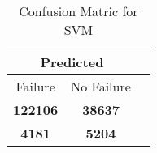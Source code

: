 \begin{table}[] 
\caption{Confusion Matric for SVM} 
\label{Table: Prediction Accuracy-NoneSVMRandomForest100EKF-ignoreReflection100.9EKF-top2-Reflection} 
\centering 
\begin{tabular} 
 {@{}ccc@{}} 
\toprule 
\multicolumn{2}{c}{\textbf{Predicted}}
 \\ \midrule 
\multicolumn{1}{|c|}{Failure} & 
\multicolumn{1}{c|}{No Failure}
 \\ \midrule 
\multicolumn{1}{|c|}{\color{green}\textbf{122106}} & 
\multicolumn{1}{c|}{\color{green}\textbf{38637}}
 \\ \midrule 
\multicolumn{1}{|c|}{\color{red}\textbf{4181}} & 
\multicolumn{1}{c|}{\color{red}\textbf{5204}}
 \\ \bottomrule 
\end{tabular} 
\end{table} 
